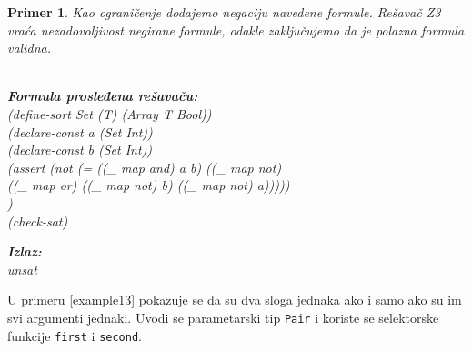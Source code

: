 \documentclass[12pt,oneside]{memoir}
\newcommand\tab[1][0.5cm]{\hspace*{#1}}
\newtheorem{primer}{Primer}
\begin{document}
\begin{primer} \label{example12} 
Kao ograničenje dodajemo negaciju navedene formule. Rešavač Z3 vraća nezadovoljivost negirane formule, odakle zaključujemo da je polazna formula validna.\\ \\
\begin{minipage}[b]{0.65\textwidth}
\textbf{Formula prosleđena rešavaču:}
\\(define-sort Set (T) (Array T Bool))
\\(declare-const a (Set Int))
\\(declare-const b (Set Int))
\\(assert (not (= ((\_ map and) a b) ((\_ map not) 
\\\tab((\_ map or) ((\_ map not) b) ((\_ map not) a)))))
\\)
\\(check-sat)
\end{minipage}
\hspace{2.5cm} 
\begin{minipage}[t]{0.5\textwidth}
\vspace{-4.65cm}
\textbf{Izlaz:}
\\unsat 
\end{minipage}
\end{primer}

\par
U primeru \ref{example13} pokazuje se da su dva sloga jednaka ako i samo ako su im svi argumenti jednaki. Uvodi se parametarski tip \texttt{Pair} i koriste se selektorske funkcije \texttt{first} i \texttt{second}. 
\end{document}
